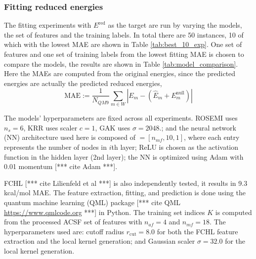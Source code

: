 \documentclass[12pt]{article}
\def\att{                    %
        \marginpar[ \hspace*{\fill} \raisebox{-0.2em}{\rule{2mm}{1.2em}} ]
        {\raisebox{-0.2em}{\rule{2mm}{1.2em}} }
        }
\def\at#1{[*** \att #1 ***]}  %
\begin{document}
\subsubsection{Fitting reduced energies}
The fitting experiments with $E^\text{red}$ as the target are run by varying the models, the set of features and the training labels. In total there are 50 instances, 10 of which with the lowest MAE are shown in Table \ref{tab:best_10_exp}.
One set of features and one set of training labels from the lowest fitting MAE is chosen to compare the models, the results are shown in Table \ref{tab:model_comparison}. Here the MAEs are computed from the original energies, since the predicted energies are actually the predicted reduced energies,
\begin{equation}
	\text{MAE} := \frac{1}{N_{QM9}}\sum_{m \in W}|E_{m} - (\hat{E}_m + E^\text{null}_m)|
\end{equation}

The models' hyperparameters are fixed across all experiments. ROSEMI uses $n_s = 6$, KRR uses scaler $c=1$, GAK uses $\sigma = 2048.$; and the neural network (NN) architecture used here is composed of $ = [n_{mf}, 10, 1]$, where each entry represents the number of nodes in $i$th layer; ReLU is chosen as the activation function in the hidden layer (2nd layer); the NN is optimized using Adam with 0.01 momentum \at{cite Adam}. 

FCHL \at{cite Lilienfeld et al} is also independently tested, it results in 9.3 kcal/mol MAE. The feature extraction, fitting, and prediction is done using the quantum machine learning (QML) package \at{cite QML \url{https://www.qmlcode.org}} in Python. 
The training set indices $K$ is computed from the processed ACSF set of features with $n_{af} = 4$ and $n_{mf} = 18$.
The hyperparameters used are: cutoff radius $r_\text{cut} = 8.0$ for both the FCHL feature extraction and the local kernel generation; and Gaussian scaler $\sigma = 32.0$ for the local kernel generation.
\end{document}
